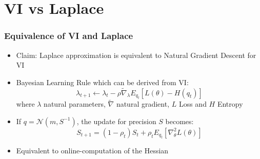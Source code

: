 \documentclass{beamer}
\begin{document}
        \section{VI vs Laplace}

        \begin{frame}
            \frametitle{Equivalence of VI and Laplace}
            \begin{itemize}
                \item Claim: Laplace approximation is equivalent to Natural Gradient Descent for VI
                \item Bayesian Learning Rule which can be derived from VI:     
                    \begin{equation}
                        \lambda_{t+1} \leftarrow \lambda_{t} - \rho \tilde{\nabla}_\lambda E_{q_t}[L(\theta) - H(q_t)]
                    \end{equation}
                    where $\lambda$ natural parameters, $\tilde{\nabla}$ natural gradient, $L$ Loss and $H$ Entropy
                \item If $q = \mathcal{N}(m, S^{-1})$, the update for precision $S$ becomes:
                    \begin{equation}
                        S_{t+1} = (1 - \rho_t) S_t + \rho_t E_{q_t}[\nabla^2_\theta L(\theta)]
                    \end{equation}
                \item Equivalent to online-computation of the Hessian
            \end{itemize}
        \end{frame}
\end{document}
